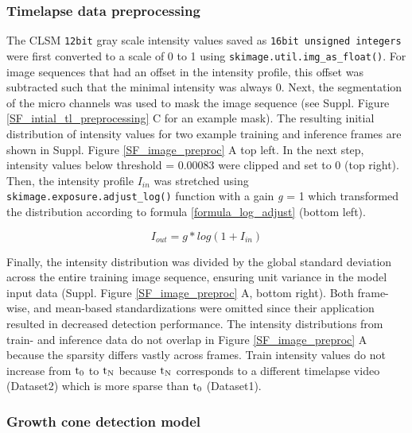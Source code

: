 \subsubsection{Timelapse data preprocessing}
The CLSM \verb|12bit| gray scale intensity values saved as 
\verb|16bit unsigned integers| were first converted to a scale of 0 to 1 using
\verb|skimage.util.img_as_float()|. For image sequences that had an offset in
the intensity profile, this offset was subtracted such that the minimal
intensity was always 0. Next, the segmentation of the micro channels was used to
mask the image sequence (see Suppl. Figure \ref{SF_intial_tl_preprocessing} C
for an example mask). The resulting initial distribution of intensity values for
two example training and inference frames are shown in  Suppl. Figure
\ref{SF_image_preproc} A top left. In the next step, intensity values below
threshold = 0.00083 were clipped and set to 0 (top right). Then, the intensity
profile $I_{in}$ was stretched using \verb|skimage.exposure.adjust_log()|
function with a gain  \textit{g} = 1 which transformed the distribution
according to formula \ref{formula_log_adjust} (bottom left). 

\begin{equation}
    I_{out} = g*log(1 + I_{in})
    \label{formula_log_adjust}
\end{equation}
\vspace{0.1mm}

Finally, the intensity distribution was divided by the global standard deviation
across the entire training image sequence, ensuring unit variance in the model
input data (Suppl. Figure \ref{SF_image_preproc} A, bottom right). Both
frame-wise, and mean-based standardizations were omitted since their application
resulted in decreased detection performance. The intensity distributions from
train- and inference data do not overlap in Figure \ref{SF_image_preproc} A
because the sparsity differs vastly across frames. Train intensity values do not
increase from $\rm t_0$ to $\rm t_N$ because $\rm t_N$ corresponds to a
different timelapse video (Dataset2) which is more sparse than $\rm t_0$
(Dataset1).


\subsubsection{Growth cone detection model}
\label{modeldescription}
